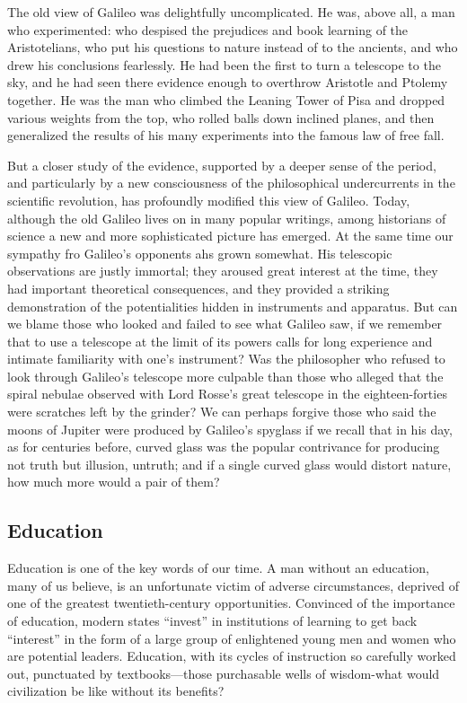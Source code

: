 \documentclass[11pt]{article}
\begin{document}
The old view of Galileo was delightfully uncomplicated. He was, above all, a man who experimented: who despised the prejudices and book learning of the Aristotelians, who put his questions to nature instead of to the ancients, and who drew his conclusions fearlessly. He had been the first to turn a telescope to the sky, and he had seen there evidence enough to overthrow Aristotle and Ptolemy together. He was the man who climbed the Leaning Tower of Pisa and dropped various weights from the top, who rolled balls down inclined planes, and then generalized the results of his many experiments into the famous law of free fall.

But a closer study of the evidence, supported by a deeper sense of the period, and particularly by a new consciousness of the philosophical undercurrents in the scientific revolution, has profoundly modified this view of Galileo. Today, although the old Galileo lives on in many popular writings, among historians of science a new and more sophisticated picture has emerged. At the same time our sympathy fro Galileo's opponents ahs grown somewhat. His telescopic observations are justly immortal; they aroused great interest at the time, they had important theoretical consequences, and they provided a striking demonstration of the potentialities hidden in instruments and apparatus. But can we blame those who looked and failed to see what Galileo saw, if we remember that to use a telescope at the limit of its powers calls for long experience and intimate familiarity with one's instrument? Was the philosopher who refused to look through Galileo's telescope more culpable than those who alleged that the spiral nebulae observed with Lord Rosse's great telescope in the eighteen-forties were scratches left by the grinder? We can perhaps forgive those who said the moons of Jupiter were produced by Galileo's spyglass if we recall that in his day, as for centuries before, curved glass was the popular contrivance for producing not truth but illusion, untruth; and if a single curved glass would distort nature, how much more would a pair of them?
\subsection{Education}
\label{sec-2-33}

Education is one of the key words of our time. A man without an education, many of us believe, is an unfortunate victim of adverse circumstances, deprived of one of the greatest twentieth-century opportunities. Convinced of the importance of education, modern states ``invest'' in institutions of learning to get back ``interest'' in the form of a large group of enlightened young men and women who are potential leaders. Education, with its cycles of instruction so carefully worked out, punctuated by textbooks---those purchasable wells of wisdom-what would civilization be like without its benefits?
\end{document}
